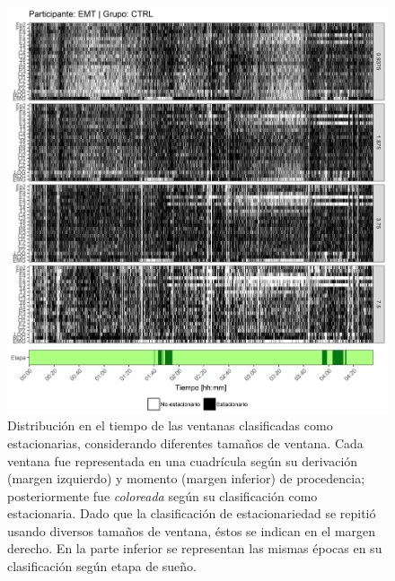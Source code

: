 \begin{figure}
\centering
\includegraphics[width=\linewidth]
{./scripts_graf_res/EMT_patrones_1.png}
\caption[Distribución en el tiempo de las ventanas clasificadas como estacionarias, considerando diferentes tamaños de ventana]{Distribución en el tiempo de las ventanas clasificadas como estacionarias, considerando diferentes tamaños de ventana. 
Cada ventana fue representada en una cuadrícula según su derivación (margen izquierdo) y momento (margen inferior) de procedencia; posteriormente fue \textit{coloreada} según su clasificación como estacionaria.
Dado que la clasificación de estacionariedad se repitió usando diversos tamaños de ventana, éstos se indican en el margen derecho.
En la parte inferior se representan las mismas épocas en su clasificación según etapa de sueño.}
\end{figure}
